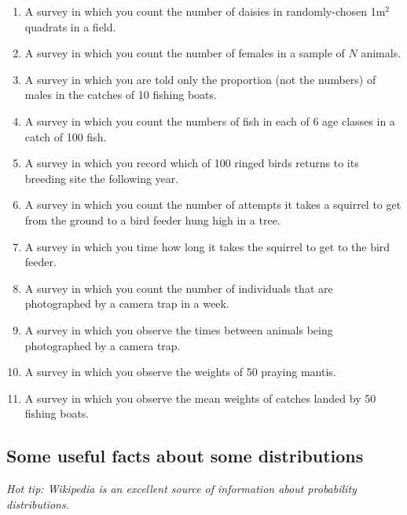 \begin{enumerate}

\item A survey in which you count the number of daisies in randomly-chosen 1m$^2$ quadrats in a field.

\item A survey in which you count the number of females in a sample of $N$ animals.

\item A survey in which you are told only the proportion (not the numbers) of males in the catches of 10 fishing boats.

\item A survey in which you count the numbers of fish in each of 6 age classes in a catch of 100 fish.

\item A survey in which you record which of 100 ringed birds returns to its breeding site the following year.

\item A survey in which you count the number of attempts it takes a squirrel to get from the ground to a bird feeder hung high in a tree.

\item A survey in which you time how long it takes the squirrel to get to the bird feeder.

\item A survey in which you count the number of individuals that are photographed by a camera trap in a week.

\item A survey in which you observe the times between animals being photographed by a camera trap.

\item A survey in which you observe the weights of 50 praying mantis.

\item A survey in which you observe the mean weights of catches landed by 50 fishing boats.

\end{enumerate}
\subsection{Some useful facts about some distributions}

\textit{Hot tip: Wikipedia is an excellent source of information about probability distributions.}

